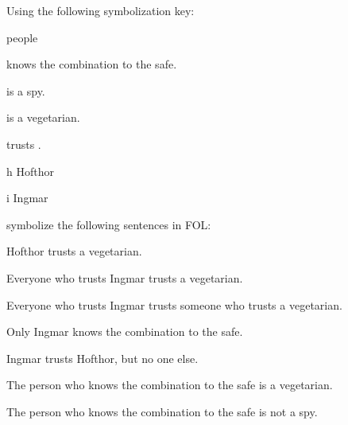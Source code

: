 \begin{practiceproblems}
\problempart
Using the following symbolization key:
\begin{ekey}
\item[\text{domain}] people
\item[\atom{K}{x}]  knows the combination to the safe.
\item[\atom{S}{x}]  is a spy.
\item[\atom{V}{x}]  is a vegetarian.
\item[\atom{T}{x,y}]  trusts .
\item[h] Hofthor
\item[i] Ingmar
\end{ekey}
symbolize the following sentences in FOL:
\begin{problemslist}
\item Hofthor trusts a vegetarian.
\item[] 
\item Everyone who trusts Ingmar trusts a vegetarian.
\item[] 
\item Everyone who trusts Ingmar trusts someone who trusts a vegetarian.
\item[] 
\item Only Ingmar knows the combination to the safe.
\item[] 
\item Ingmar trusts Hofthor, but no one else.
\item[] 
\item The person who knows the combination to the safe is a vegetarian.
\item[] 
\item The person who knows the combination to the safe is not a spy.
\item[] 
\end{problemslist}



\end{practiceproblems}
